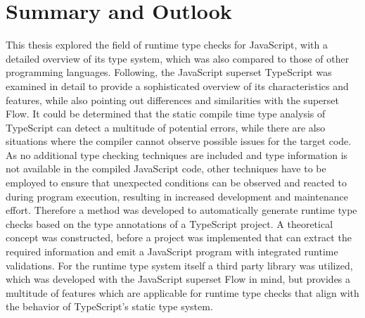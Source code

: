 \chapter{Summary and Outlook}
\label{cha:summary_outlook}

This thesis explored the field of runtime type checks for JavaScript, with a detailed overview of its type system, which was also compared to those of other programming languages. Following, the JavaScript superset TypeScript was examined in detail to provide a sophisticated overview of its characteristics and features, while also pointing out differences and similarities with the superset Flow. It could be determined that the static compile time type analysis of TypeScript can detect a multitude of potential errors, while there are also situations where the compiler cannot observe possible issues for the target code. As no additional type checking techniques are included and type information is not available in the compiled JavaScript code, other techniques have to be employed to ensure that unexpected conditions can be observed and reacted to during program execution, resulting in increased development and maintenance effort. Therefore a method was developed to automatically generate runtime type checks based on the type annotations of a TypeScript project. A theoretical concept was constructed, before a project was implemented that can extract the required information and emit a JavaScript program with integrated runtime validations. For the runtime type system itself a third party library was utilized, which was developed with the JavaScript superset Flow in mind, but provides a multitude of features which are applicable for runtime type checks that align with the behavior of TypeScript's static type system.

